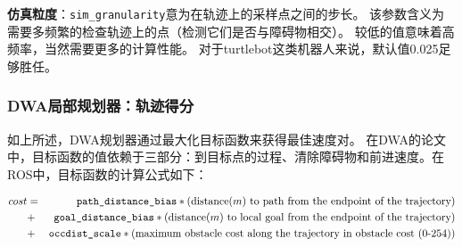 
\textbf{仿真粒度}：\texttt{sim\_granularity}意为在轨迹上的采样点之间的步长。
该参数含义为需要多频繁的检查轨迹上的点（检测它们是否与障碍物相交）。
较低的值意味着高频率，当然需要更多的计算性能。
对于turtlebot这类机器人来说，默认值0.025足够胜任。

\subsubsection[DWA Local Planner: Trajactory Scoring]{DWA局部规划器：轨迹得分}

如上所述，DWA规划器通过最大化目标函数来获得最佳速度对。
在DWA的论文中，目标函数的值依赖于三部分：到目标点的过程、清除障碍物和前进速度。在ROS中，目标函数的计算公式如下：

\begin{eqnarray*}\footnotesize
	cost &=& \texttt{path\_distance\_bias} * (\text{distance($m$) to path from the endpoint of the trajectory})\\
	&+& \texttt{goal\_distance\_bias} * (\text{distance($m$) to local goal from the endpoint of the trajectory})\\
	&+& \texttt{occdist\_scale} * (\text{maximum obstacle cost along the trajectory in obstacle cost (0-254)})
\end{eqnarray*}


